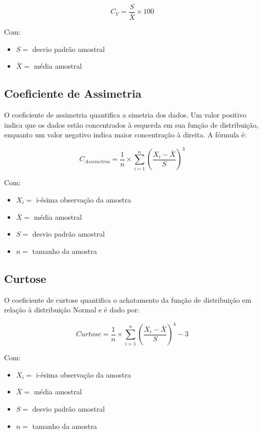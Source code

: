 \documentclass[
  portuguese,
]{estat/estat}
\begin{document}
\[C_V=\frac{S}{\bar{X}}\times 100\]

Com:

\begin{itemize}
\item
  \(S =\) desvio padrão amostral
\item
  \(\bar{X} =\) média amostral
\end{itemize}

\subsection{Coeficiente de Assimetria}\label{coeficiente-de-assimetria}

O coeficiente de assimetria quantifica a simetria dos dados. Um valor
positivo indica que os dados estão concentrados à esquerda em sua função
de distribuição, enquanto um valor negativo indica maior concentração à
direita. A fórmula é:

\[C_{Assimetria} = \frac{1}{n}\times\sum\limits_{i=1}^{n} \left(\frac{X_i - \bar{X}}{S}\right)^3 \]

Com:

\begin{itemize}
\item
  \(X_i =\) i-ésima observação da amostra
\item
  \(\bar{X} =\) média amostral
\item
  \(S=\) desvio padrão amostral
\item
  \(n=\) tamanho da amostra
\end{itemize}

\subsection{Curtose}\label{curtose}

O coeficiente de curtose quantifica o achatamento da função de
distribuição em relação à distribuição Normal e é dado por:

\[Curtose = \frac{1}{n}\times\sum\limits_{i=1}^{n}\left(\frac{ X_i-\bar{X} }{S} \right)^4 - 3\]

Com:

\begin{itemize}
\item
  \(X_i =\) i-ésima observação da amostra
\item
  \(\bar{X} =\) média amostral
\item
  \(S =\) desvio padrão amostral
\item
  \(n =\) tamanho da amostra
\end{itemize}
\end{document}
